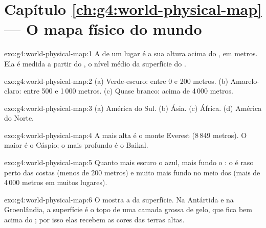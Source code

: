 \section*{Capítulo \ref{ch:g4:world-physical-map} --- O mapa físico do mundo}

\begin{solution}{exo:g4:world-physical-map:1}
A  de um lugar é a sua altura acima do , em metros.
Ela é medida a partir do , o nível médio da superfície do .
\end{solution}

\begin{solution}{exo:g4:world-physical-map:2}
(a) Verde-escuro: entre 0 e 200 metros. (b) Amarelo-claro: entre 500 e
1\,000 metros. (c) Quase branco: acima de 4\,000 metros.
\end{solution}

\begin{solution}{exo:g4:world-physical-map:3}
(a) América do Sul. (b) Ásia. (c) África. (d) América do Norte.
\end{solution}

\begin{solution}{exo:g4:world-physical-map:4}
A  mais alta é o monte Everest (8\,849 metros). O maior  é o
 Cáspio; o  mais profundo é o  Baikal.
\end{solution}

\begin{solution}{exo:g4:world-physical-map:5}
Quanto mais escuro o azul, mais fundo o : o  é raso perto das costas
(menos de 200 metros) e muito mais fundo no meio dos  (mais de
4\,000 metros em muitos lugares).
\end{solution}

\begin{solution}{exo:g4:world-physical-map:6}
O  mostra a  da superfície. Na Antártida e na
Groenlândia, a superfície é o topo de uma camada grossa de gelo, que fica
bem acima do ; por isso elas recebem as cores das terras altas.
\end{solution}

